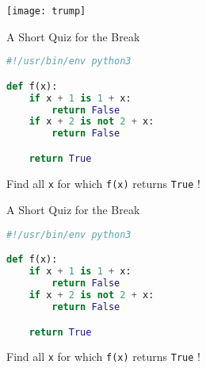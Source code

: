 \begin{frame}
    \centering
    \scalebox{3}{Time to grab some covfefe}

    \vspace{1cm}

    \texttt{[image: trump]}
\end{frame}

\addtocounter{framenumber}{-1}
\begin{frame}[fragile]{A Short Quiz for the Break}
    \begin{lstlisting}[language=python]
#!/usr/bin/env python3

def f(x):
    if x + 1 is 1 + x:
        return False
    if x + 2 is not 2 + x:
        return False

    return True
    \end{lstlisting}

    Find all \texttt{x} for which \texttt{f(x)} returns \texttt{True} !
\end{frame}

\addtocounter{framenumber}{-1}
\begin{frame}[fragile]{A Short Quiz for the Break}
    \begin{lstlisting}[language=python]
#!/usr/bin/env python3

def f(x):
    if x + 1 is 1 + x:
        return False
    if x + 2 is not 2 + x:
        return False

    return True
    \end{lstlisting}

    Find all \texttt{x} for which \texttt{f(x)} returns \texttt{True} !

    \begin{center}
    \end{center}
\end{frame}
